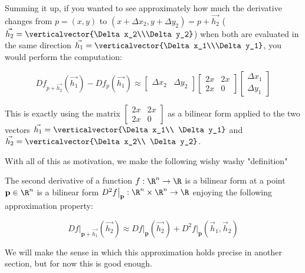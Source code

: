 \documentclass{ximera}
\begin{document}
Summing it up, if you wanted to see approximately how much the derivative changes from $p = (x,y)$ to $(x+\Delta x_2,y+\Delta y_2) = p+\vec{h_2}$ 
($\vec{h_2} = \verticalvector{\Delta x_2\\\Delta y_2}$)
when both are evaluated in the same direction  $\vec{h_1} = \verticalvector{\Delta x_1\\\Delta y_1}$, you would perform the computation:

\[ 
Df_{p+\vec{h_2}}(\vec{h_1})  -Df_p(\vec{h_1}) \approx
\begin{bmatrix} 
\Delta x_2 & \Delta y_2\end{bmatrix} 
 \begin{bmatrix} 2x&2x\\2x&0\end{bmatrix} \begin{bmatrix} \Delta x_1\\ \Delta y_1\end{bmatrix}
 \]
 
 This is exactly using the matrix $\begin{bmatrix} 2x&2x\\2x&0\end{bmatrix}$ as a bilinear form applied to the two vectors 
 $\vec{h_1} = \verticalvector{\Delta x_1\\ \Delta y_1}$ and $\vec{h_2} = \verticalvector{\Delta x_2\\ \Delta y_2}$.
 
With all of this as motivation, we make the following wishy washy "definition"

\begin{definition}
	The second derivative of a function $f:\R^n \to \R$ is a bilinear form at a point $\mathbf{p}\in \R^n$  
	is a bilinear form $D^2f\big|_\mathbf{p} : \R^n \times \R^n \to \R$ enjoying the following approximation property:
	
	\[
		Df\big|_{\mathbf{p}+\vec{h_1}}(\vec{h_2})  \approx Df\big|_\mathbf{p}(\vec{h_2}) + D^2f\big|_\mathbf{p} (\vec{h}_1,\vec{h}_2)
	\]
	
\end{definition} 

We will make the sense in which this approximation holds precise in another section, but for now this is good enough.
\end{document}
